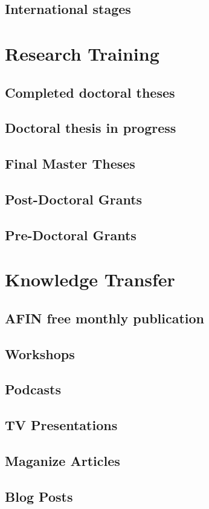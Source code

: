 \documentclass[english,a4paper,12pt,titlepage]{report}
\begin{document}
  \section{International stages}
       
     
  \chapter{Research Training}

  \section{Completed doctoral theses}
	
  \section{Doctoral thesis in progress}
  	
  \section{Final Master Theses}
  	
  \section{Post-Doctoral Grants}
  	
  \section{Pre-Doctoral Grants}
  	

  \chapter{Knowledge Transfer}

  \section{AFIN free monthly publication}
  	
  \section{Workshops}
  	
  \section{Podcasts}
  	
  \section{TV Presentations}
  	
   \section{Maganize Articles}
   	
   \section{Blog Posts} 
   	
\end{document}
